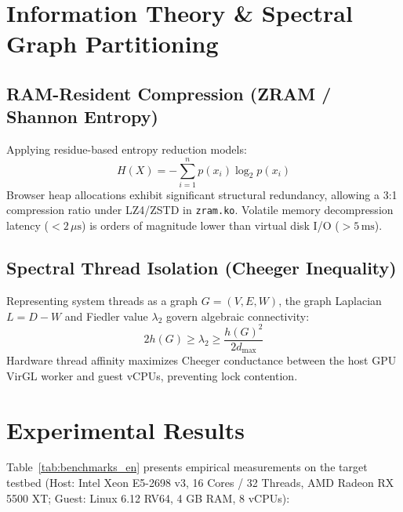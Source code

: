 \documentclass[10pt,twocolumn]{article}
\begin{document}
\section{Information Theory \& Spectral Graph Partitioning}

\subsection{RAM-Resident Compression (ZRAM / Shannon Entropy)}
Applying residue-based entropy reduction models:
\begin{equation}
H(X) = -\sum_{i=1}^n p(x_i) \log_2 p(x_i)
\end{equation}
Browser heap allocations exhibit significant structural redundancy, allowing a 3:1 compression ratio under LZ4/ZSTD in \texttt{zram.ko}. Volatile memory decompression latency ($< 2\,\mu\text{s}$) is orders of magnitude lower than virtual disk I/O ($> 5\,\text{ms}$).

\subsection{Spectral Thread Isolation (Cheeger Inequality)}
Representing system threads as a graph $G = (V, E, W)$, the graph Laplacian $L = D - W$ and Fiedler value $\lambda_2$ govern algebraic connectivity:
\begin{equation}
2 h(G) \ge \lambda_2 \ge \frac{h(G)^2}{2 d_{\max}}
\end{equation}
Hardware thread affinity maximizes Cheeger conductance between the host GPU VirGL worker and guest vCPUs, preventing lock contention.

\section{Experimental Results}

Table~\ref{tab:benchmarks_en} presents empirical measurements on the target testbed (Host: Intel Xeon E5-2698 v3, 16 Cores / 32 Threads, AMD Radeon RX 5500 XT; Guest: Linux 6.12 RV64, 4 GB RAM, 8 vCPUs):

\begin{table}[htbp]
\centering
\caption{Performance Metrics of the Optimized RISC-V Ecosystem}
\label{tab:benchmarks_en}
\end{table}
\end{document}
